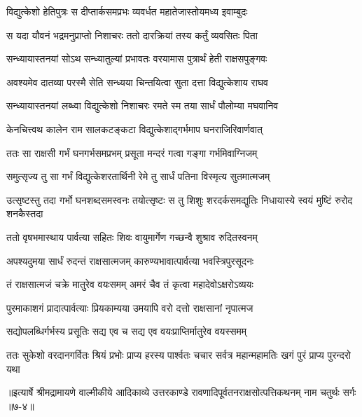 \twolineshloka
{विद्युत्केशो हेतिपुत्रः स दीप्तार्कसमप्रभः}
{व्यवर्धत महातेजास्तोयमध्य इवाम्बुदः} %

\twolineshloka
{स यदा यौवनं भद्रमनुप्राप्तो निशाचरः}
{ततो दारक्रियां तस्य कर्तुं व्यवसितः पिता} %

\twolineshloka
{सन्ध्यायास्तनयां सोऽथ सन्ध्यातुल्यां प्रभावतः}
{वरयामास पुत्रार्थं हेती राक्षसपुङ्गवः} %

\twolineshloka
{अवश्यमेव दातव्या परस्मै सेति सन्ध्यया}
{चिन्तयित्वा सुता दत्ता विद्युत्केशाय राघव} %

\twolineshloka
{सन्ध्यायास्तनयां लब्ध्वा विद्युत्केशो निशाचरः}
{रमते स्म तया सार्धं पौलोम्या मघवानिव} %

\twolineshloka
{केनचित्त्वथ कालेन राम सालकटङ्कटा}
{विद्युत्केशाद्गर्भमाप घनराजिरिवार्णवात्} %

\twolineshloka
{ततः सा राक्षसी गर्भं घनगर्भसमप्रभम्}
{प्रसूता मन्दरं गत्वा गङ्गा गर्भमिवाग्निजम्} %

\twolineshloka
{समुत्सृज्य तु सा गर्भं विद्युत्केशरतार्थिनी}
{रेमे तु सार्धं पतिना विस्मृत्य सुतमात्मजम्} %

\threelineshloka
{उत्सृष्टस्तु तदा गर्भो घनशब्दसमस्वनः}
{तयोत्सृष्टः स तु शिशुः शरदर्कसमद्युतिः}
{निधायास्ये स्वयं मुष्टिं रुरोद शनकैस्तदा} %

\twolineshloka
{ततो वृषभमास्थाय पार्वत्या सहितः शिवः}
{वायुमार्गेण गच्छन्वै शुश्राव रुदितस्वनम्} %

\twolineshloka
{अपश्यदुमया सार्धं रुदन्तं राक्षसात्मजम्}
{कारुण्यभावात्पार्वत्या भवस्त्रिपुरसूदनः} %

\twolineshloka
{तं राक्षसात्मजं चक्रे मातुरेव वयःसमम्}
{अमरं चैव तं कृत्वा महादेवोऽक्षरोऽव्ययः} %

\twolineshloka
{पुरमाकाशगं प्रादात्पार्वत्याः प्रियकाम्यया}
{उमयापि वरो दत्तो राक्षसानां नृपात्मज} %

\twolineshloka
{सद्योपलब्धिर्गर्भस्य प्रसूतिः सद्य एव च}
{सद्य एव वयःप्राप्तिर्मातुरेव वयस्समम्} %

\twolineshloka
{ततः सुकेशो वरदानगर्वितः श्रियं प्रभोः प्राप्य हरस्य पार्श्वतः}
{चचार सर्वत्र महान्महामतिः खगं पुरं प्राप्य पुरन्दरो यथा} %


॥इत्यार्षे श्रीमद्रामायणे वाल्मीकीये आदिकाव्ये उत्तरकाण्डे रावणादिपूर्वतनराक्षसोत्पत्तिकथनम् नाम चतुर्थः सर्गः ॥७-४॥
